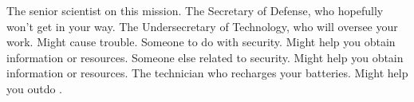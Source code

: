 \documentclass[char]{guildcamp3}
\begin{document}
\begin{contacts}
  \contact{\cSciOne{}} The senior scientist on this mission.
  \contact{\cPoliOne{}} The Secretary of Defense, who hopefully won't get in your way.
  \contact{\cPoliTwo{}} The Undersecretary of Technology, who will oversee your work. Might cause trouble.
  \contact{\cSpecOpOne{}} Someone to do with security. Might help you obtain information or resources.
  \contact{\cSpecOpTwo{}} Someone else related to security. Might help you obtain information or resources.
  \contact{\cTech{}} The technician who recharges your batteries. Might help you outdo \cSciOne{}.
\end{contacts}
\end{document}
